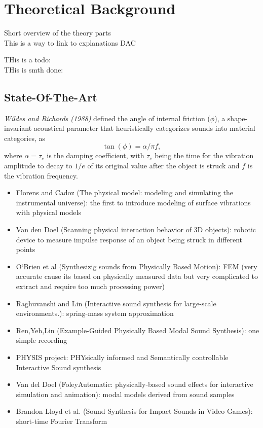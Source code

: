 \chapter{Theoretical Background}\label{ch:theory}
Short overview of the theory parts\\

This is a way to link to explanations \gls{DAC} 

THis is a todo: 
\\
THis is smth done:
\done{}

\section{State-Of-The-Art}\label{sec:state_art}
\textit{Wildes and Richards (1988)} defined the angle of internal friction ($\phi$), a shape-invariant acoustical parameter that heuristically categorizes sounds into material categories, as
\begin{equation}\label{eq:tanf}
\tan(\phi) = \alpha / \pi f,
\end{equation}
where $\alpha = \tau_e$ is the damping coefficient, with $\tau_e$ being the time for the vibration amplitude to decay to $1/e$ of its original value after the object is struck  and $f$ is the vibration frequency\cite{giordano2006material}.

\begin{itemize}
\item  Florens and Cadoz (The physical model: modeling and simulating the instrumental universe): the first to introduce modeling of surface vibrations with physical models
\item Van den Doel (Scanning physical interaction behavior of 3D objects): robotic device to measure impulse response of an object being struck in different points
\item  O`Brien et al (Synthesizig sounds from Physically Based Motion): FEM (very accurate cause its based on physically measured data but very complicated to extract and require too much processing power)
\item Raghuvanshi and Lin (Interactive sound synthesis for large-scale environments.): spring-mass system approximation
\item Ren,Yeh,Lin (Example-Guided Physically Based Modal Sound Synthesis): one simple recording
\item PHYSIS project: PHYsically informed and Semantically controllable
Interactive Sound synthesis
\item Van del Doel (FoleyAutomatic: physically-based sound effects for interactive simulation and animation): modal models derived from sound samples
\item Brandon Lloyd et al. (Sound Synthesis for Impact Sounds in Video Games): short-time Fourier Transform
\end{itemize}


